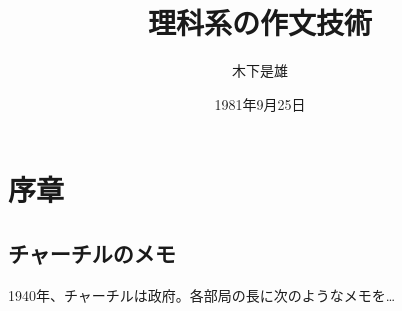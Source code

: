 \documentclass{jlreq}
\begin{document}
\title{理科系の作文技術}
\author{木下是雄}
\date{1981年9月25日}
\maketitle

\section{序章}
\subsection{チャーチルのメモ}
 1940年、チャーチルは政府。各部局の長に次のようなメモを…
\end{document}

